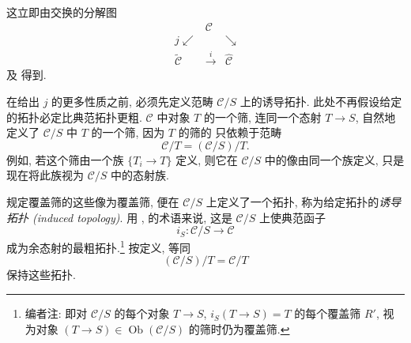 这立即由交换的分解图
\[
\begin{array}{ccc}
 &\mathscr C&\\[-0.5ex]
 {\scriptstyle j}\swarrow&&\searrow\\[-0.5ex]
 \widetilde{\mathscr C}&\xrightarrow{\ i\ }&\widehat{\mathscr C}
\end{array}
\]
及  得到.

在给出 \(j\) 的更多性质之前, 必须先定义范畴 \(\mathscr C/S\)
上的诱导拓扑. 此处不再假设给定的拓扑必定比典范拓扑更粗.
\(\mathscr C\) 中对象 \(T\) 的一个筛, 连同一个态射 \(T\to S\),
自然地定义了 \(\mathscr C/S\) 中 \(T\) 的一个筛,
因为 \(T\) 的筛的
只依赖于范畴
\[
  \mathscr C/T=(\mathscr C/S)/T.
\]
例如, 若这个筛由一个族 \(\{T_i\to T\}\) 定义,
则它在 \(\mathscr C/S\) 中的像由同一个族定义,
只是现在将此族视为 \(\mathscr C/S\) 中的态射族.

规定覆盖筛的这些像为覆盖筛, 便在 \(\mathscr C/S\) 上定义了一个拓扑,
称为给定拓扑的\emph{诱导拓扑 (induced topology)}.
用 , 
的术语来说, 这是 \(\mathscr C/S\) 上使典范函子
\[
  i_S:\mathscr C/S\longrightarrow\mathscr C
\]
成为余态射的最粗拓扑.\footnote{编者注: 即对 \(\mathscr C/S\)
的每个对象 \(T\to S\), \(i_S(T\to S)=T\) 的每个覆盖筛
\(R'\), 视为对象 \((T\to S)\in\operatorname{Ob}(\mathscr C/S)\)
的筛时仍为覆盖筛.}
按定义, 等同
\[
  (\mathscr C/S)/T=\mathscr C/T
\]
保持这些拓扑.


